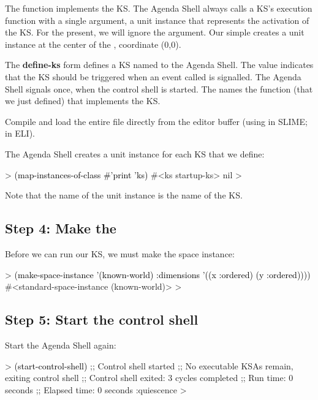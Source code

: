 \documentclass[10pt,twoside,english,pdftex]{article}
\begin{document}
The function  implements the KS.  The Agenda Shell
always calls a KS's execution function with a single argument, a 
unit instance that represents the activation of the KS.  For the present, we
will ignore the  argument.  Our simple 
creates a  unit instance at the center of the
, coordinate (0,0).

The \textbf{define-ks} form defines a KS named  to the
Agenda Shell.  The  value indicates that the KS should
be triggered when an event called  is
signalled.  The Agenda Shell signals  once,
when the control shell is started.  The  names the
function (that we just defined) that implements the KS.

Compile and load the entire  file directly from
the editor buffer (using  in SLIME;  in ELI).

The Agenda Shell creates a  unit instance for each KS that we
define:
%
\begin{example}\color{darkergray}%
  > \textcolor{black}{(map-instances-of-class #'print 'ks)}
  #<ks startup-ks> 
  nil
  >
\end{example}

Note that the name of the  unit instance is the name of the KS.

\subsection*{Step 4: Make the }

Before we can run our KS, we must make the  space
instance:
%
\begin{example}\color{darkergray}%
  > \textcolor{black}{(make-space-instance '(known-world)
              :dimensions '((x :ordered) (y :ordered))))}
  #<standard-space-instance (known-world)>
  >
\end{example}

\subsection*{Step 5: Start the control shell}

%
Start the Agenda Shell again:
%
\begin{example}\color{darkergray}%
  > \textcolor{black}{(start-control-shell)}
  ;; Control shell started
  ;; No executable KSAs remain, exiting control shell
  ;; Control shell exited: 3 cycles completed
  ;; Run time: 0 seconds
  ;; Elapsed time: 0 seconds
  :quiescence
  >
\end{example}
\end{document}
